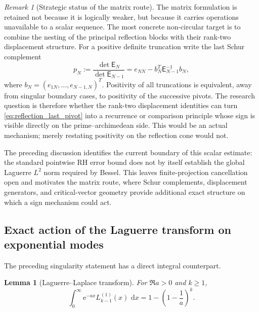 \documentclass[11pt]{amsart}
\numberwithin{equation}{section}
\theoremstyle{plain}
\newtheorem{lemma}[theorem]{Lemma}
\theoremstyle{definition}
\theoremstyle{remark}
\newtheorem{remark}[theorem]{Remark}
\newcommand{\E}{\mathsf E}
\newcommand{\e}{\mathrm e}
\newcommand{\dd}{\,\mathrm d}
\begin{document}
\begin{remark}[Strategic status of the matrix route]
\label{rem:matrix_route_needs_mechanism}
The matrix formulation is retained not because it is logically weaker, but because it carries operations unavailable to a scalar sequence.  The most concrete non-circular target is to combine the nesting of the principal reflection blocks with their rank-two displacement structure.  For a positive definite truncation write the last Schur complement
\begin{equation}
 p_N:=\frac{\det \E_N}{\det \E_{N-1}}
 =e_{NN}-b_N^T\E_{N-1}^{-1}b_N,
 \label{eq:reflection_last_pivot}
\end{equation}
where $b_N=(e_{1N},\ldots,e_{N-1,N})^T$.  Positivity of all truncations is equivalent, away from singular boundary cases, to positivity of the successive pivots.  The research question is therefore whether the rank-two displacement identities can turn \eqref{eq:reflection_last_pivot} into a recurrence or comparison principle whose sign is visible directly on the prime--archimedean side.  This would be an actual mechanism; merely restating positivity on the reflection cone would not.
\end{remark}

The preceding discussion identifies the current boundary of this scalar estimate: the standard pointwise RH error bound does not by itself establish the global Laguerre $L^2$ norm required by Bessel.  This leaves finite-projection cancellation open and motivates the matrix route, where Schur complements, displacement generators, and critical-vector geometry provide additional exact structure on which a sign mechanism could act.

\subsection{Exact action of the Laguerre transform on exponential modes}

The preceding singularity statement has a direct integral counterpart.

\begin{lemma}[Laguerre--Laplace transform]
\label{lem:laguerre_laplace_transform}
For $\Re a>0$ and $k\ge1$,
\begin{equation}
 \boxed{
 \int_0^\infty \e^{-ax}L_{k-1}^{(1)}(x)\,\dd x
 =1-\left(1-\frac1a\right)^k.}
 \label{eq:Laguerre_Laplace_exact}
\end{equation}
\end{lemma}
\end{document}
